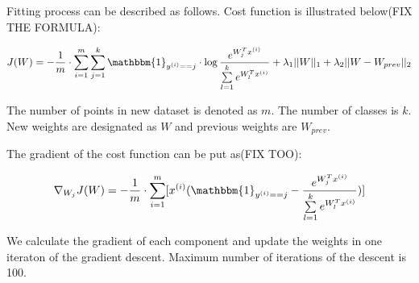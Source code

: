 Fitting process can be described as follows. Cost function is illustrated below(FIX THE FORMULA):

$$J(W) = -\frac{1}{m} \cdot \sum \limits_{i = 1}^{m} \sum \limits_{j = 1}^{k} \mathbbm{1}_{y^{(i)} == j} \cdot \log \frac{e^{W_{j}^Tx^{(i)}}}{\sum \limits_{l = 1}^{k}  e^{W_{l}^Tx^{(i)}}} + \lambda_1 ||W||_1 + \lambda_2 ||W - W_{prev}||_2 $$

The number of points in new dataset is denoted as $m$. The number of classes is $k$. New weights are designated as $W$ and previous weights are $W_{prev}$.

The gradient of the cost function can be put as(FIX TOO):

$$ \nabla_{W_j} J(W) = -\frac{1}{m} \cdot \sum \limits_{i = 1}^{m} [ x^{(i)} ( \mathbbm{1}_{y^{(i)} == j} - \frac{e^{W_{j}^Tx^{(i)}}}{\sum \limits_{l = 1}^{k}  e^{W_{l}^Tx^{(i)}}} ) ] $$

We calculate the gradient of each component and update the weights in one iteraton of the gradient descent. Maximum number of iterations of the descent is 100.